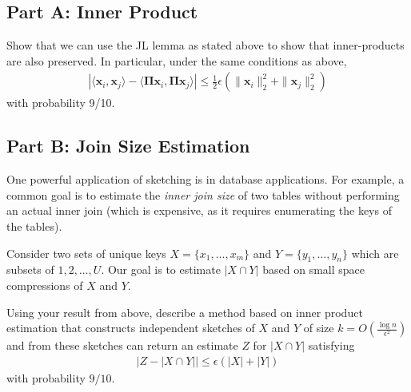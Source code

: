 \documentclass{article}
\begin{document}
\hypertarget{part-a-inner-product}{%
\subsection*{Part A: Inner Product}\label{part-a-inner-product}}

Show that we can use the JL lemma as stated above to show that inner-products are also preserved. In particular, under the same conditions as above, \begin{align*}
|
\langle \mathbf{x}_i, \mathbf{x}_j \rangle
- \langle \mathbf{\Pi x}_i, \mathbf{\Pi x}_j \rangle
|
\leq \frac12 \epsilon (\|\mathbf{x}_i\|_2^2 + \|\mathbf{x}_j\|_2^2)
\end{align*} with probability 9/10.

\hypertarget{part-b-join-size-estimation}{%
\subsection*{Part B: Join Size Estimation}\label{part-b-join-size-estimation}}

One powerful application of sketching is in database applications. For example, a common goal is to estimate the \emph{inner join size} of two tables without performing an actual inner join (which is expensive, as it requires enumerating the keys of the tables).

Consider two sets of unique keys \(X = \{x_1, \ldots, x_m\}\) and \(Y = \{y_1, \ldots, y_n\}\) which are subsets of \(1,2, \ldots, U\). Our goal is to estimate \(|X\cap Y|\) based on small space compressions of \(X\) and \(Y\).

Using your result from above, describe a method based on inner product estimation that constructs independent sketches of \(X\) and \(Y\) of size \(k = O\left(\frac{\log n}{\epsilon^2}\right)\) and from these sketches can return an estimate \(Z\) for \(|X\cap Y|\) satisfying \begin{align*}
    \left|Z - |X\cap Y|\right| \leq \epsilon (|X|+|Y|)
\end{align*} with probability \(9/10\).
\end{document}
